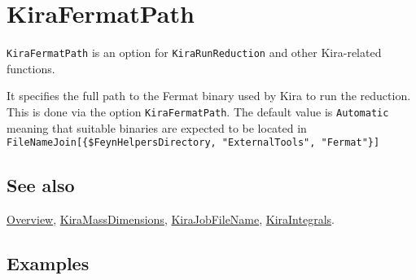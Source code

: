 \documentclass[../FeynHelpersManual.tex]{subfiles}
\begin{document}
\hypertarget{kirafermatpath}{
\section{KiraFermatPath}\label{kirafermatpath}}

\texttt{KiraFermatPath} is an option for \texttt{KiraRunReduction} and
other Kira-related functions.

It specifies the full path to the Fermat binary used by Kira to run the
reduction. This is done via the option \texttt{KiraFermatPath}. The
default value is \texttt{Automatic} meaning that suitable binaries are
expected to be located in
\texttt{FileNameJoin[\allowbreak{}\{\allowbreak{}\$FeynHelpersDirectory,\ \allowbreak{}"ExternalTools",\ \allowbreak{}"Fermat"\}]}

\subsection{See also}

\hyperlink{toc}{Overview},
\hyperlink{kiramassdimensions}{KiraMassDimensions},
\hyperlink{kirajobfilename}{KiraJobFileName},
\hyperlink{kiraintegrals}{KiraIntegrals}.

\subsection{Examples}
\end{document}
